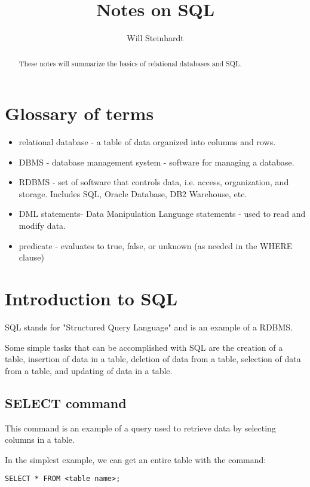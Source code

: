 \documentclass[]{article}
\title{Notes on SQL}
\author{Will Steinhardt}
\begin{document}
\maketitle

\begin{abstract}
These notes will summarize the basics of relational databases and SQL.
\end{abstract}

\section{Glossary of terms}
\begin{itemize}
	\item relational database - a table of data organized into columns and rows.
	\item DBMS - database management system - software for managing a database.
	\item RDBMS - set of software that controls data, i.e. access, organization, and storage.  Includes SQL, Oracle Database, DB2 Warehouse, etc.
	\item DML statements- Data Manipulation Language statements - used to read and modify data. 
	\item predicate - evaluates to true, false, or unknown (as needed in the WHERE clause)
\end{itemize}

\section{Introduction to SQL}
SQL stands for "Structured Query Language" and is an example of a RDBMS. 

Some simple tasks that can be accomplished with SQL are the creation of a table, insertion of data in a table, deletion of data from a table, selection of data from a table, and updating of data in a table.

\subsection{SELECT command}
This command is an example of a query used to retrieve data by selecting columns in a table.

In the simplest example, we can get an entire table with the command:

\begin{verbatim}
SELECT * FROM <table name>;
\end{verbatim}
\end{document}

